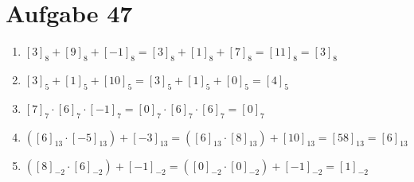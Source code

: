 \section{Aufgabe 47}
\begin{enumerate}
    \item $[3]_8 + [9]_8 + [-1]_8 = [3]_8 + [1]_8 + [7]_8 = [11]_8 = [3]_8$
    \item $[3]_5 + [1]_5 + [10]_5 = [3]_5 + [1]_5 + [0]_5 = [4]_5$
    \item $[7]_7 \cdot [6]_7 \cdot [-1]_7 = [0]_7 \cdot [6]_7 \cdot [6]_7 = [0]_7$
    \item $([6]_{13} \cdot [-5]_{13}) + [-3]_{13} = ([6]_{13} \cdot [8]_{13}) + [10]_{13} = [58]_{13} = [6]_{13}$
    \item $([8]_{-2} \cdot [6]_{-2}) + [-1]_{-2} = ([0]_{-2} \cdot [0]_{-2}) + [-1]_{-2} = [1]_{-2}$
\end{enumerate}
